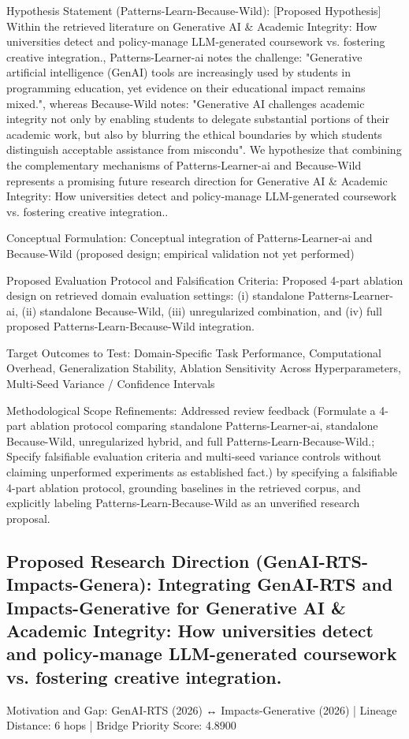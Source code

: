 \documentclass[10pt,twocolumn,letterpaper]{article}
\begin{document}
Hypothesis Statement (Patterns-Learn-Because-Wild): [Proposed Hypothesis] Within the retrieved literature on Generative AI \& Academic Integrity: How universities detect and policy-manage LLM-generated coursework vs. fostering creative integration., Patterns-Learner-ai notes the challenge: "Generative artificial intelligence (GenAI) tools are increasingly used by students in programming education, yet evidence on their educational impact remains mixed.", whereas Because-Wild notes: "Generative AI challenges academic integrity not only by enabling students to delegate substantial portions of their academic work, but also by blurring the ethical boundaries by which students distinguish acceptable assistance from miscondu". We hypothesize that combining the complementary mechanisms of Patterns-Learner-ai and Because-Wild represents a promising future research direction for Generative AI \& Academic Integrity: How universities detect and policy-manage LLM-generated coursework vs. fostering creative integration..

Conceptual Formulation: Conceptual integration of Patterns-Learner-ai and Because-Wild (proposed design; empirical validation not yet performed)

Proposed Evaluation Protocol and Falsification Criteria: Proposed 4-part ablation design on retrieved domain evaluation settings: (i) standalone Patterns-Learner-ai, (ii) standalone Because-Wild, (iii) unregularized combination, and (iv) full proposed Patterns-Learn-Because-Wild integration.

Target Outcomes to Test: Domain-Specific Task Performance, Computational Overhead, Generalization Stability, Ablation Sensitivity Across Hyperparameters, Multi-Seed Variance / Confidence Intervals

Methodological Scope Refinements: Addressed review feedback (Formulate a 4-part ablation protocol comparing standalone Patterns-Learner-ai, standalone Because-Wild, unregularized hybrid, and full Patterns-Learn-Because-Wild.; Specify falsifiable evaluation criteria and multi-seed variance controls without claiming unperformed experiments as established fact.) by specifying a falsifiable 4-part ablation protocol, grounding baselines in the retrieved corpus, and explicitly labeling Patterns-Learn-Because-Wild as an unverified research proposal.

\subsection{Proposed Research Direction (GenAI-RTS-Impacts-Genera): Integrating GenAI-RTS and Impacts-Generative for Generative AI \& Academic Integrity: How universities detect and policy-manage LLM-generated coursework vs. fostering creative integration.}
Motivation and Gap: GenAI-RTS (2026) ↔ Impacts-Generative (2026) | Lineage Distance: 6 hops | Bridge Priority Score: 4.8900
\end{document}
